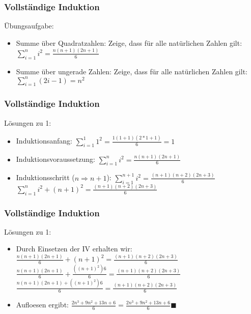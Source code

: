 \begin{frame}
    \frametitle{Vollständige Induktion}
    Übungsaufgabe:
        \begin{itemize}

    \vfill \item Summe über Quadratzahlen: Zeige, dass für alle natürlichen Zahlen gilt:
    \newline $\sum_{i=1}^{n} i^2 = \frac{n(n+1)(2n+1)}{6}$
     \vfill \item Summe über ungerade Zahlen: Zeige, dass für alle natürlichen Zahlen gilt:
    \newline $\sum_{i=1}^{n} (2i-1) = n^2$
    \end{itemize}

\end{frame}

\begin{frame}
    \frametitle{Vollständige Induktion}
    Lösungen zu 1:
        \begin{itemize}

    \vfill \item Induktionsanfang:
    \newline $\sum_{i=1}^{1} 1^2 = \frac{1(1+1)(2*1+1)}{6}=1$
    \newline \item Induktionsvoraussetzung:
    \newline $\sum_{i=1}^{n} i^2 = \frac{n(n+1)(2n+1)}{6}$
        \vfill \item Induktionsschritt ($n \Rightarrow n+1$):
    \newline $\sum_{i=1}^{n+1} i^2 = \frac{(n+1)(n+2)(2n+3)}{6}$
            \vfill $\sum_{i=1}^{n} i^2 + (n+1)^2 = \frac{(n+1)(n+2)(2n+3)}{6}$
    \end{itemize}

\end{frame}

\begin{frame}
    \frametitle{Vollständige Induktion}
    Lösungen zu 1:
        \begin{itemize}
            \vfill $\sum_{i=1}^{n} i^2 + (n+1)^2 = \frac{(n+1)(n+2)(2n+3)}{6}$
            \vfill \item Durch Einsetzen der IV erhalten wir:
            \vfill $\frac{n(n+1)(2n+1)}{6} + (n+1)^2 = \frac{(n+1)(n+2)(2n+3)}{6} $
            \vfill $\frac{n(n+1)(2n+1)}{6} + \frac{((n+1)^2)6}{6} = \frac{(n+1)(n+2)(2n+3)}{6}$
            \vfill $\frac{n(n+1)(2n+1) + ((n+1)^2)6}{6} = \frac{(n+1)(n+2)(2n+3)}{6}$
            \vfill \item Aufloesen ergibt:
            \vfill $\frac{2n^3 + 9n^2 + 13n + 6}{6} = \frac{2n^3 + 9n^2 + 13n + 6}{6} \blacksquare$
        \end{itemize}

\end{frame}

